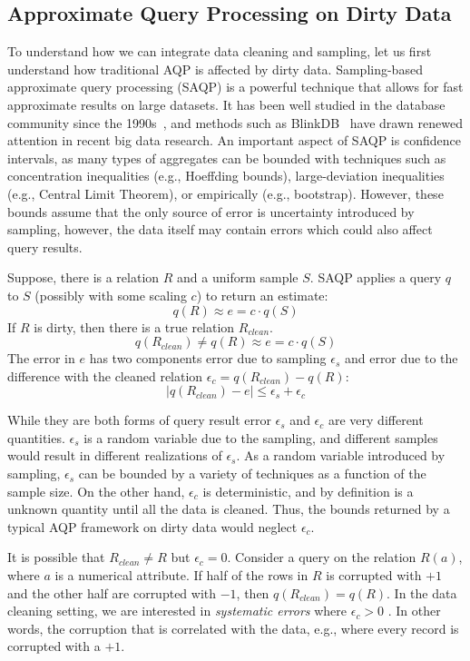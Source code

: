 \subsection{Approximate Query Processing on Dirty Data}
To understand how we can integrate data cleaning and sampling, let us first understand how traditional AQP is affected by dirty data.
Sampling-based approximate query processing (SAQP) is a powerful technique that allows for fast approximate results on large datasets. 
It has been well studied in the database community since the 1990s~\cite{DBLP:conf/sigmod/HellersteinHW97,DBLP:conf/sigmod/AcharyaGPR99}, and methods such as BlinkDB~\cite{DBLP:conf/eurosys/AgarwalMPMMS13} have drawn renewed attention in recent big data research. 
An important aspect of SAQP is confidence intervals, as many types of aggregates can be bounded with techniques such as concentration inequalities (e.g., Hoeffding bounds), large-deviation inequalities (e.g., Central Limit Theorem), or empirically (e.g., bootstrap).
However, these bounds assume that the only source of error is uncertainty introduced by sampling, however, the data itself may contain errors which could also affect query results. 

Suppose, there is a relation $R$ and a uniform sample $S$.
SAQP applies a query $q$ to $S$ (possibly with some scaling $c$) to return an estimate:
\[
q(R) \approx e = c \cdot q(S)
\]
If $R$ is dirty, then there is a true relation $R_{clean}$.
\[
q(R_{clean}) \ne q(R) \approx e = c \cdot q(S)
\]
The error in $e$ has two components error due to sampling $\epsilon_s$ and error due to the difference with the cleaned relation $\epsilon_c = q(R_{clean}) - q(R)$:
\[
\mid q(R_{clean}) - e \mid \le \epsilon_s + \epsilon_c
\]

While they are both forms of query result error $\epsilon_s$ and $\epsilon_c$ are very different quantities.
$\epsilon_s$ is a random variable due to the sampling, and different samples would result in different realizations of $\epsilon_s$.
As a random variable introduced by sampling, $\epsilon_s$ can be bounded by a variety of techniques as a function of the sample size.
On the other hand, $\epsilon_c$ is deterministic, and by definition is a unknown quantity until all the data is cleaned.
Thus, the bounds returned by a typical AQP framework on dirty data would neglect $\epsilon_c$.

It is possible that $R_{clean} \ne R$ but $\epsilon_c=0$.
Consider a \sumfunc query on the relation $R(a)$, where $a$ is a numerical attribute.
If half of the rows in $R$ is corrupted with $+1$ and the other half are corrupted with $-1$, then $q(R_{clean}) = q(R)$.
In the data cleaning setting, we are interested in \emph{systematic errors} where $\epsilon_c > 0$ \cite{taylor1982introduction}. 
In other words, the corruption that is correlated with the data, e.g., where every record is corrupted with a $+1$.


